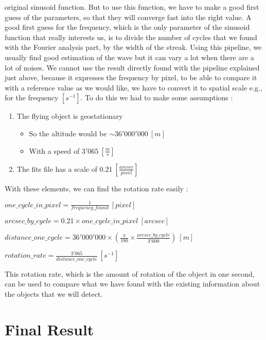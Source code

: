 \documentclass[a4paper,12pt,oneside]{report}
\begin{document}
original sinusoid function. But to use this function, we have to make a good first guess of the parameters, so that they will converge 
fast into the right value. A good first guess for the frequency, which is the only parameter of the sinusoid function that really interests us, is to 
divide the number of cycles that we found with the Fourier analysis part, by the width of the streak. 
\newline
Using this pipeline, we usually find good estimation of the wave but it can vary a lot when there are a lot of noises.
\newline
\newline
We cannot use the result directly found with the pipeline explained just above, because it expresses the frequency by pixel, to be able to
compare it with a reference value as we would like, we have to convert it to spatial scale e.g., for the frequency $[s^{-1}]$. To do this
we had to make some assumptions : 
\begin{enumerate}
    \item The flying object is geostationary
    \begin{itemize}
    \item So the altitude would be $\sim 36'000'000\ [m]$
    \item With a speed of $3'065\ [\frac{m}{s}]$
    \end{itemize}
    \item The fits file has a scale of $0.21\ [\frac{arcsec}{pixel}]$
\end{enumerate}
With these elements, we can find the rotation rate easily :
\begin{center}
$one\_cycle\_in\_pixel = \frac{1}{frequency\_found}\ [pixel]$

$arcsec\_by\_cycle = 0.21 \times one\_cycle\_in\_pixel\ [arcsec]$

$distance\_one\_cycle = 36'000'000 \times (\frac{\pi}{180} \times \frac{arcsec\_by\_cycle}{3'600})\ [m]$

$rotation\_rate = \frac{3'065}{distance\_one\_cycle}\ [s^{-1}]$
\end{center}
This rotation rate, which is the amount of rotation of the object in one second, can be used to compare what we have found with 
the existing information about the objects that we will detect.




\chapter{Final Result}
\end{document}
